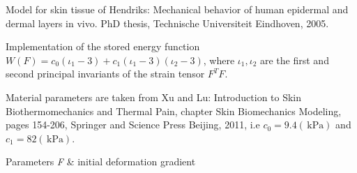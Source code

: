 Model for skin tissue of Hendriks\-: Mechanical behavior of human epidermal and dermal layers in vivo. Ph\-D thesis, Technische Universiteit Eindhoven, 2005. 

Implementation of the stored energy function $W(F)=c_0(\iota_1-3) + c_1(\iota_1-3)(\iota_2-3)$, where $\iota_1,\iota_2$ are the first and second principal invariants of the strain tensor $F^T F$.

Material parameters are taken from Xu and Lu\-: Introduction to Skin Biothermomechanics and Thermal Pain, chapter Skin Biomechanics Modeling, pages 154-\/206, Springer and Science Press Beijing, 2011, i.\-e $c_0=9.4 (\,\mathrm{kPa})$ and $ c_1 = 82 (\,\mathrm{kPa}) $.


\begin{DoxyParams}{Parameters}
{\em F} & initial deformation gradient \\
\hline
\end{DoxyParams}
